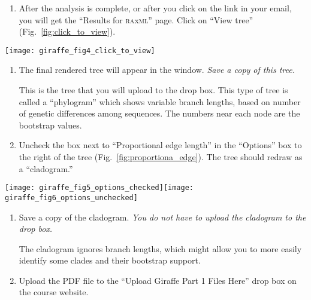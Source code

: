 \documentclass[11pt, addpoints]{exam}
\begin{document}
\begin{enumerate}[resume]
	\item After the analysis is complete, or after you click on the link in your email,
	you will get the “Results for \textsc{ra}x\textsc{ml}” page. Click on 
	“View tree” (Fig.~\ref{fig:click_to_view}).
\end{enumerate}


\begin{center}
	\texttt{[image: giraffe\_fig4\_click\_to\_view]}
\end{center}

\begin{enumerate}[resume]
	\item The final rendered tree will appear in the window. \emph{Save a copy of this tree.} 
	
	 This is the tree that you will upload to the drop box. This type of tree is called
	a “phylogram” which shows variable branch lengths, based on number of 
	genetic differences among sequences. The numbers near each node are the bootstrap values.
	
	\item Uncheck the box next to “Proportional edge length” in the “Options”
	box to the right of the tree (Fig.~\ref{fig:proportiona_edge}). The tree should
	redraw as a “cladogram.”
	
\end{enumerate}

\begin{center}
	\hfil\texttt{[image: giraffe\_fig5\_options\_checked]}\hfil\texttt{[image: giraffe\_fig6\_options\_unchecked]}\hfill
\end{center}

\begin{enumerate}[resume]
	\item Save a copy of the cladogram. \emph{You do not have to upload the cladogram to the drop box.}

	The cladogram ignores branch lengths, which might allow you to more easily identify some clades and their bootstrap support.

\item
  Upload the PDF file to the ``Upload Giraffe Part 1 Files Here'' drop
  box on the course website.
\end{enumerate}
\end{document}
